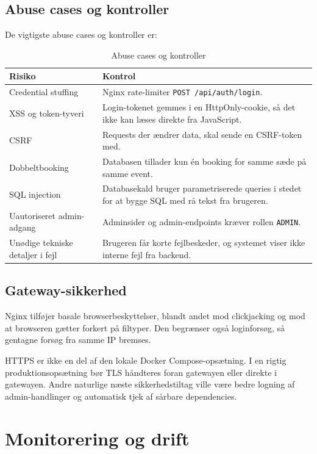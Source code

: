 \documentclass[11pt,a4paper]{article}
\newcommand{\code}[1]{\texttt{#1}}
\begin{document}
\subsection{Abuse cases og kontroller}

De vigtigste abuse cases og kontroller er:

\begin{table}[h]
\centering
\caption{Abuse cases og kontroller}
\begin{tabularx}{\textwidth}{@{}L{4cm}Y@{}}
\toprule
Risiko & Kontrol \\
\midrule
Credential stuffing & Nginx rate-limiter \code{POST /api/auth/login}. \\
XSS og token-tyveri & Login-tokenet gemmes i en HttpOnly-cookie, så det ikke kan læses direkte fra JavaScript. \\
CSRF & Requests der ændrer data, skal sende en CSRF-token med. \\
Dobbeltbooking & Databasen tillader kun én booking for samme sæde på samme event. \\
SQL injection & Databasekald bruger parametriserede queries i stedet for at bygge SQL med rå tekst fra brugeren. \\
Uautoriseret admin-adgang & Adminsider og admin-endpoints kræver rollen \code{ADMIN}. \\
Unødige tekniske detaljer i fejl & Brugeren får korte fejlbeskeder, og systemet viser ikke interne fejl fra backend. \\
\bottomrule
\end{tabularx}
\end{table}

\subsection{Gateway-sikkerhed}

Nginx tilføjer basale browserbeskyttelser, blandt andet mod clickjacking og mod at browseren gætter forkert på filtyper. Den begrænser også loginforsøg, så gentagne forsøg fra samme IP bremses.

HTTPS er ikke en del af den lokale Docker Compose-opsætning. I en rigtig produktionsopsætning bør TLS håndteres foran gatewayen eller direkte i gatewayen. Andre naturlige næste sikkerhedstiltag ville være bedre logning af admin-handlinger og automatisk tjek af sårbare dependencies.

\section{Monitorering og drift}
\end{document}
